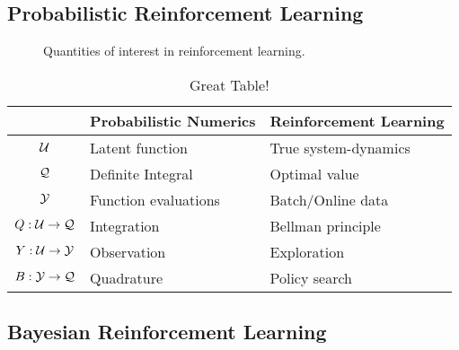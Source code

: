\subsection{Probabilistic Reinforcement Learning}
\label{sub:probabilistic_reinforcement_learning}
\begin{figure}[t]
    \centering
    
    \caption[Quantities of interest in reinforcement learning]{
        Quantities of interest in reinforcement learning.
        \label{fig:quantities_of_interest_rl}
    }
\end{figure}
\begin{table}[t]
    \centering
    \caption{Great Table!}
    \label{tab:label}
    \begin{tabularx}{\textwidth}{cYY}
        \toprule
        & Probabilistic Numerics & Reinforcement Learning \\
        \midrule
        $\mathcal{U}$ & Latent function & True system-dynamics \\
        $\mathcal{Q}$ & Definite Integral & Optimal value \\
        $\mathcal{Y}$ & Function evaluations & Batch/Online data \\
        \midrule
        $Q : \mathcal{U} \to \mathcal{Q}$ & Integration & Bellman principle \\
        $Y : \mathcal{U} \to \mathcal{Y}$ & Observation & Exploration \\
        $B : \mathcal{Y} \to \mathcal{Q}$ & Quadrature & Policy search \\
        \bottomrule
    \end{tabularx}
\end{table}


\subsection{Bayesian Reinforcement Learning}
\label{sub:bayesian_reinforcement_learning}


\nocite{*}
\printbibliography

